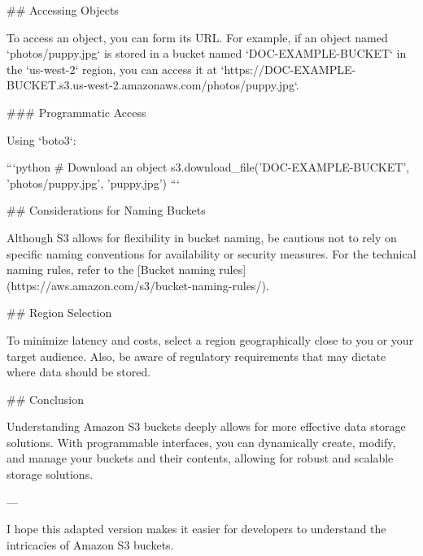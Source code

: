 ## Accessing Objects

To access an object, you can form its URL. For example, if an object named `photos/puppy.jpg` is stored in a bucket named `DOC-EXAMPLE-BUCKET` in the `us-west-2` region, you can access it at `https://DOC-EXAMPLE-BUCKET.s3.us-west-2.amazonaws.com/photos/puppy.jpg`.

### Programmatic Access

Using `boto3`:

```python
# Download an object
s3.download_file('DOC-EXAMPLE-BUCKET', 'photos/puppy.jpg', 'puppy.jpg')
```

## Considerations for Naming Buckets

Although S3 allows for flexibility in bucket naming, be cautious not to rely on specific naming conventions for availability or security measures. For the technical naming rules, refer to the [Bucket naming rules](https://aws.amazon.com/s3/bucket-naming-rules/).

## Region Selection

To minimize latency and costs, select a region geographically close to you or your target audience. Also, be aware of regulatory requirements that may dictate where data should be stored. 

## Conclusion

Understanding Amazon S3 buckets deeply allows for more effective data storage solutions. With programmable interfaces, you can dynamically create, modify, and manage your buckets and their contents, allowing for robust and scalable storage solutions.

---

I hope this adapted version makes it easier for developers to understand the intricacies of Amazon S3 buckets.